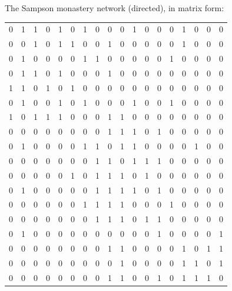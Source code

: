 \documentclass[ 10pt]{beamer}
\begin{document}
{The Sampson monastery network (directed), in matrix form:
{\tiny
\begin{table}[ht]
\begin{center}
\begin{tabular}{rrrrrrrrrrrrrrrrrr}
  \hline
0 & 1 & 1 & 0 & 1 & 0 & 1 & 0 & 0 & 0 & 1 & 0 & 0 & 0 & 1 & 0 & 0 & 0 \\ 
0 & 0 & 1 & 0 & 1 & 1 & 0 & 0 & 1 & 0 & 0 & 0 & 0 & 0 & 1 & 0 & 0 & 0 \\ 
0 & 1 & 0 & 0 & 0 & 0 & 1 & 1 & 0 & 0 & 0 & 0 & 0 & 1 & 0 & 0 & 0 & 0 \\ 
0 & 1 & 1 & 0 & 1 & 0 & 0 & 0 & 1 & 0 & 0 & 0 & 0 & 0 & 0 & 0 & 0 & 0 \\ 
1 & 1 & 0 & 1 & 0 & 1 & 0 & 0 & 0 & 0 & 0 & 0 & 0 & 0 & 0 & 0 & 0 & 0 \\ 
0 & 1 & 0 & 0 & 1 & 0 & 1 & 0 & 0 & 0 & 1 & 0 & 0 & 1 & 0 & 0 & 0 & 0 \\ 
1 & 0 & 1 & 1 & 1 & 0 & 0 & 0 & 1 & 1 & 0 & 0 & 0 & 0 & 0 & 0 & 0 & 0 \\ 
0 & 0 & 0 & 0 & 0 & 0 & 0 & 0 & 1 & 1 & 1 & 0 & 1 & 0 & 0 & 0 & 0 & 0 \\ 
0 & 1 & 0 & 0 & 0 & 0 & 1 & 1 & 0 & 1 & 1 & 0 & 0 & 0 & 0 & 1 & 0 & 0 \\ 
0 & 0 & 0 & 0 & 0 & 0 & 0 & 1 & 1 & 0 & 1 & 1 & 1 & 0 & 0 & 0 & 0 & 0 \\ 
0 & 0 & 0 & 0 & 0 & 1 & 0 & 1 & 1 & 1 & 0 & 1 & 0 & 0 & 0 & 0 & 0 & 0 \\ 
0 & 1 & 0 & 0 & 0 & 0 & 0 & 1 & 1 & 1 & 1 & 0 & 1 & 0 & 0 & 0 & 0 & 0 \\ 
0 & 0 & 0 & 0 & 0 & 0 & 1 & 1 & 1 & 1 & 0 & 0 & 0 & 1 & 0 & 0 & 0 & 0 \\ 
0 & 0 & 0 & 0 & 0 & 0 & 0 & 1 & 1 & 1 & 0 & 1 & 1 & 0 & 0 & 0 & 0 & 0 \\ 
0 & 1 & 0 & 0 & 0 & 0 & 0 & 0 & 0 & 0 & 0 & 0 & 1 & 0 & 0 & 0 & 0 & 1 \\ 
0 & 0 & 0 & 0 & 0 & 0 & 0 & 0 & 1 & 1 & 0 & 0 & 0 & 0 & 1 & 0 & 1 & 1 \\ 
0 & 0 & 0 & 0 & 0 & 0 & 0 & 0 & 0 & 1 & 0 & 0 & 0 & 0 & 1 & 1 & 0 & 1 \\ 
0 & 0 & 0 & 0 & 0 & 0 & 0 & 0 & 1 & 1 & 0 & 0 & 1 & 0 & 1 & 1 & 1 & 0 \\ 
   \hline
\end{tabular}
\end{center}
\end{table}}
}
\frame
\end{document}
